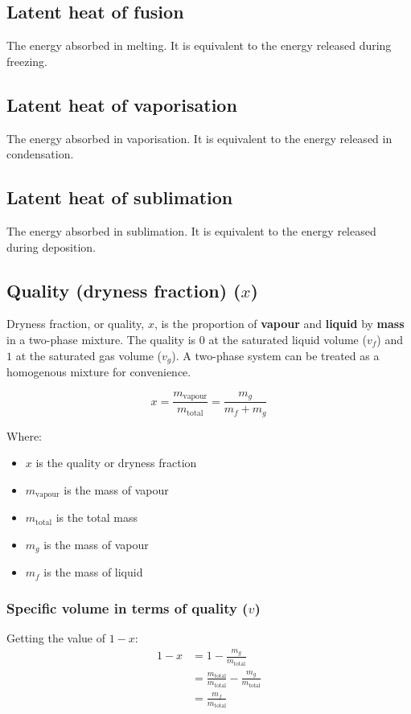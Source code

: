 \documentclass[11pt]{article}
\begin{document}
\subsection{Latent heat of fusion}
\label{sec:org314c47a}
The energy absorbed in melting. It is equivalent to the energy released during freezing.

\subsection{Latent heat of vaporisation}
\label{sec:orgf719aee}
The energy absorbed in vaporisation. It is equivalent to the energy released in condensation.

\subsection{Latent heat of sublimation}
\label{sec:orgcdd6bed}
The energy absorbed in sublimation. It is equivalent to the energy released during deposition.

\subsection{Quality (dryness fraction) (\(x\))}
\label{sec:org7e66591}
Dryness fraction, or quality, \(x\), is the proportion of \textbf{vapour} and \textbf{liquid} by \textbf{mass} in a two-phase mixture. The quality is \(0\) at the saturated liquid volume (\(v_f\)) and \(1\) at the saturated gas volume (\(v_g\)). A two-phase system can be treated as a homogenous mixture for convenience.

\[x = \frac{m_{\text{vapour}}}{m_{\text{total}}} = \frac{m_g}{m_f + m_g}\]

Where:
\begin{itemize}
\item \(x\) is the quality or dryness fraction
\item \(m_{\text{vapour}}\) is the mass of vapour
\item \(m_{\text{total}}\) is the total mass
\item \(m_g\) is the mass of vapour
\item \(m_f\) is the mass of liquid
\end{itemize}

\newpage

\subsubsection{Specific volume in terms of quality (\(v\))}
\label{sec:orgbb83f4c}
Getting the value of \(1 - x\):
\begin{align*}
1 - x &= 1 - \frac{m_g}{m_{\text{total}}} \\
&= \frac{m_{\text{total}}}{m_{\text{total}}} - \frac{m_g}{m_{\text{total}}} \\
&= \frac{m_f}{m_{\text{total}}}
\end{align*}
\end{document}
